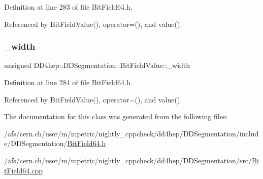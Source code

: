 Definition at line 283 of file Bit\+Field64.\+h.



Referenced by Bit\+Field\+Value(), operator=(), and value().

\hypertarget{class_d_d4hep_1_1_d_d_segmentation_1_1_bit_field_value_afe3513613815254bce43b62ef21b9f20}{}\label{class_d_d4hep_1_1_d_d_segmentation_1_1_bit_field_value_afe3513613815254bce43b62ef21b9f20} 
\subsubsection{\texorpdfstring{\+\_\+width}{\_width}}
{\footnotesize\ttfamily unsigned D\+D4hep\+::\+D\+D\+Segmentation\+::\+Bit\+Field\+Value\+::\+\_\+width\hspace{0.3cm}{\ttfamily [protected]}}



Definition at line 284 of file Bit\+Field64.\+h.



Referenced by Bit\+Field\+Value(), operator=(), and value().



The documentation for this class was generated from the following files\+:\begin{DoxyCompactItemize}
\item 
/afs/cern.\+ch/user/m/mpetric/nightly\+\_\+cppcheck/dd4hep/\+D\+D\+Segmentation/include/\+D\+D\+Segmentation/\hyperlink{_d_d_segmentation_2include_2_d_d_segmentation_2_bit_field64_8h}{Bit\+Field64.\+h}\item 
/afs/cern.\+ch/user/m/mpetric/nightly\+\_\+cppcheck/dd4hep/\+D\+D\+Segmentation/src/\hyperlink{_bit_field64_8cpp}{Bit\+Field64.\+cpp}\end{DoxyCompactItemize}
